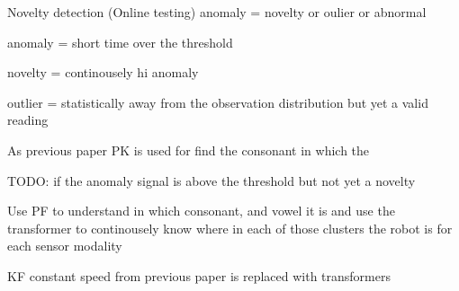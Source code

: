 \begin{frame}{Novelty detection (Online testing)}
    anomaly = novelty or oulier or abnormal
    
    anomaly = short time over the threshold
    
    novelty = continousely hi anomaly
    
    outlier = statistically away from the observation distribution but yet a valid reading
    
    As previous paper PK is used for find the consonant in which the
    
    TODO: if the anomaly signal is above the threshold but not yet a novelty
    
    Use PF to understand in which consonant, and vowel it is and use the transformer to continousely know where in each of those clusters the robot is for each sensor modality
    
    KF constant speed from previous paper is replaced with transformers
\end{frame}